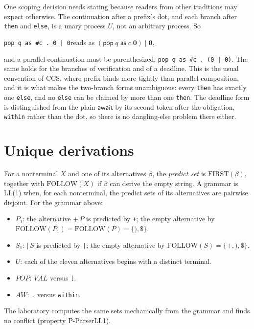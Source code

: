 \documentclass[11pt,openany]{book}
\theoremstyle{remark}
\begin{document}
One scoping decision needs stating because readers from other traditions
may expect otherwise. The continuation after a prefix's dot, and each
branch after \texttt{then} and \texttt{else}, is a unary process $U$, not an
arbitrary process. So
\begin{center}
\texttt{pop q as \#c . 0 | 0}\quad reads as\quad
$(\mathsf{pop}\;q\;\mathsf{as}\;c.\mathbf 0)\mid\mathbf 0$,
\end{center}
and a parallel continuation must be parenthesized,
\texttt{pop q as \#c . (0 | 0)}. The same holds for the branches of
verification and of a deadline. This is the usual convention of CCS, where
prefix binds more tightly than parallel composition, and it is what makes
the two-branch forms unambiguous: every \texttt{then} has exactly one
\texttt{else}, and no \texttt{else} can be claimed by more than one
\texttt{then}. The deadline form is distinguished from the plain
$\mathsf{await}$ by its second token after the obligation,
\texttt{within} rather than the dot, so there is no dangling-else
problem there either.

\section{Unique derivations}

For a nonterminal $X$ and one of its alternatives $\beta$, the
\emph{predict set} is $\mathrm{FIRST}(\beta)$, together with
$\mathrm{FOLLOW}(X)$ if $\beta$ can derive the empty string. A grammar is
LL(1) when, for each nonterminal, the predict sets of its alternatives
are pairwise disjoint. For the grammar above:
\begin{itemize}[leftmargin=1.5em]
\item $P_1$: the alternative $\texttt{+}\,P$ is predicted by \texttt{+};
the empty alternative by $\mathrm{FOLLOW}(P_1)=\mathrm{FOLLOW}(P)=
\{\texttt{)},\$\}$.
\item $S_1$: $\texttt{|}\,S$ is predicted by \texttt{|}; the empty
alternative by $\mathrm{FOLLOW}(S)=\{\texttt{+},\texttt{)},\$\}$.
\item $U$: each of the eleven alternatives begins with a distinct
terminal.
\item $\mathit{POP}$: $\mathit{VAL}$ versus \texttt{[}.
\item $\mathit{AW}$: \texttt{.} versus \texttt{within}.
\end{itemize}
The laboratory computes the same sets mechanically from the grammar and
finds no conflict (property P-ParserLL1).
\end{document}
